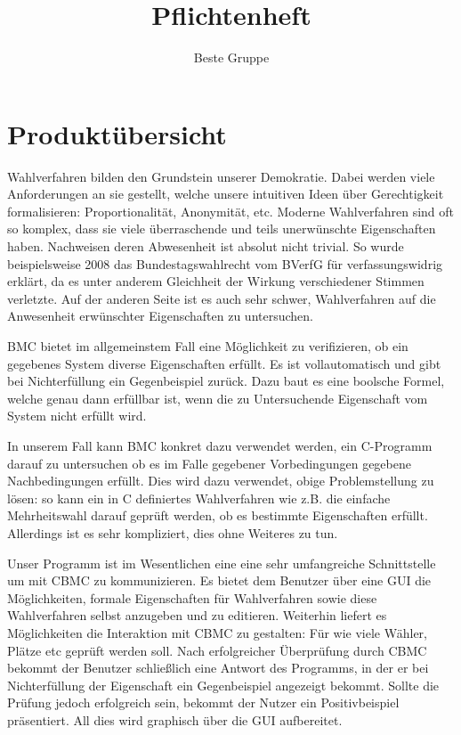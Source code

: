 \documentclass[a4paper]{scrreprt}
\begin{document}
\title{Pflichtenheft}
\author{Beste Gruppe}
\maketitle
 
\begin{acronym} %
\end{acronym}

\tableofcontents	
 
\chapter{Produktübersicht}
Wahlverfahren bilden den Grundstein unserer Demokratie. Dabei werden viele Anforderungen an sie gestellt, welche unsere intuitiven Ideen über Gerechtigkeit formalisieren: Proportionalität, Anonymität, etc. Moderne Wahlverfahren sind oft so komplex, dass sie viele überraschende und teils unerwünschte Eigenschaften haben. Nachweisen deren Abwesenheit ist absolut nicht trivial. So wurde beispielsweise 2008 das Bundestagswahlrecht vom BVerfG für verfassungswidrig erklärt, da es unter anderem Gleichheit der Wirkung verschiedener Stimmen verletzte. Auf der anderen Seite ist es auch sehr schwer, Wahlverfahren auf die Anwesenheit erwünschter Eigenschaften zu untersuchen.

\ac{BMC} bietet im allgemeinstem Fall eine Möglichkeit zu verifizieren, ob ein gegebenes System diverse Eigenschaften erfüllt. Es ist vollautomatisch und gibt bei Nichterfüllung ein Gegenbeispiel zurück. Dazu baut es eine boolsche Formel, welche genau dann erfüllbar ist, wenn die zu Untersuchende Eigenschaft vom System nicht erfüllt wird. 

In unserem Fall kann \ac{BMC} konkret dazu verwendet werden, ein C-Programm darauf zu untersuchen ob es im Falle gegebener Vorbedingungen gegebene Nachbedingungen erfüllt. Dies wird dazu verwendet, obige Problemstellung zu lösen: so kann ein in C definiertes Wahlverfahren wie z.B. die einfache Mehrheitswahl darauf geprüft werden, ob es bestimmte Eigenschaften erfüllt. Allerdings ist es sehr kompliziert, dies ohne Weiteres zu tun. 

Unser Programm ist im Wesentlichen eine eine sehr umfangreiche Schnittstelle um mit \ac{CBMC} zu kommunizieren. Es bietet dem Benutzer über eine \ac{GUI} die Möglichkeiten, formale Eigenschaften für Wahlverfahren sowie diese Wahlverfahren selbst anzugeben und zu editieren. Weiterhin liefert es Möglichkeiten die Interaktion mit \ac{CBMC} zu gestalten: Für wie viele Wähler, Plätze etc geprüft werden soll. Nach erfolgreicher Überprüfung durch \ac{CBMC} bekommt der Benutzer schließlich eine Antwort des Programms, in der er bei Nichterfüllung der Eigenschaft ein Gegenbeispiel angezeigt bekommt. Sollte die Prüfung jedoch erfolgreich sein, bekommt der Nutzer ein Positivbeispiel präsentiert. All dies wird graphisch über die \ac{GUI} aufbereitet.
\end{document}
